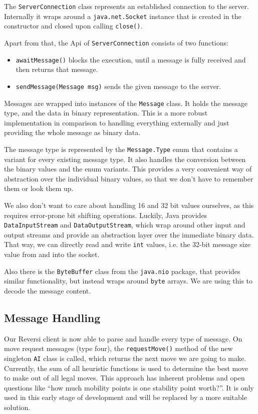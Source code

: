 \documentclass[a4paper,12pt]{article}
\begin{document}
    The \texttt{ServerConnection} class represents an established connection to the server. Internally it wraps around a \texttt{java.net.Socket} instance that is created in the constructor and closed upon calling \texttt{close()}.
    
    Apart from that, the Api of \texttt{ServerConnection} consists of two functions:
    \begin{itemize}
        \item \texttt{awaitMessage()} blocks the execution, until a message is fully received and then returns that message.
        \item \texttt{sendMessage(Message msg)} sends the given message to the server.
    \end{itemize}
    
    Messages are wrapped into instances of the \texttt{Message} class. It holds the message type, and the data in binary representation. This is a more robust implementation in comparison to handling everything externally and just providing the whole message as binary data.
    
    The message type is represented by the \texttt{Message.Type} enum that contains a variant for every existing message type. It also handles the conversion between the binary values and the enum variants. This provides a very convenient way of abstraction over the individual binary values, so that we don't have to remember them or look them up.
    
    We also don't want to care about handling 16 and 32 bit values ourselves, as this requires error-prone bit shifting operations. Luckily, Java provides \texttt{DataInputStream} and \texttt{DataOutputStream}, which wrap around other input and output streams and provide an abstraction layer over the immediate binary data. That way, we can directly read and write \texttt{int} values, i.e. the 32-bit message size value from and into the socket.
    
    Also there is the \texttt{ByteBuffer} class from the \texttt{java.nio} package, that provides similar functionality, but instead wraps around \texttt{byte} arrays. We are using this to decode the message content.
    
    \subsection{Message Handling}
    
    Our Reversi client is now able to parse and handle every type of message. On move request messages (type four), the \texttt{requestMove()} method of the new singleton \texttt{AI} class is called, which returns the next move we are going to make. Currently, the sum of all heuristic functions is used to determine the best move to make out of all legal moves. This approach has inherent problems and open questions like ``how much mobility points is one stability point worth?''. It is only used in this early stage of development and will be replaced by a more suitable solution. 
    
\end{document}
